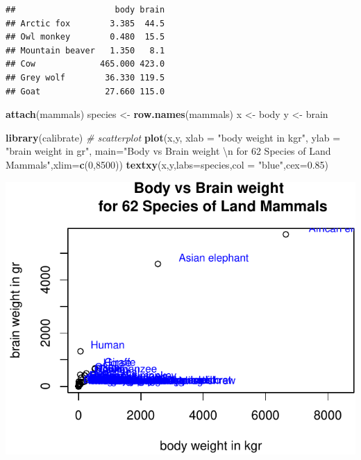\documentclass[]{article}
\newenvironment{Shaded}{\begin{snugshade}}{\end{snugshade}}
\newcommand{\KeywordTok}[1]{\textcolor[rgb]{0.13,0.29,0.53}{\textbf{{#1}}}}
\newcommand{\DataTypeTok}[1]{\textcolor[rgb]{0.13,0.29,0.53}{{#1}}}
\newcommand{\DecValTok}[1]{\textcolor[rgb]{0.00,0.00,0.81}{{#1}}}
\newcommand{\FloatTok}[1]{\textcolor[rgb]{0.00,0.00,0.81}{{#1}}}
\newcommand{\CharTok}[1]{\textcolor[rgb]{0.31,0.60,0.02}{{#1}}}
\newcommand{\StringTok}[1]{\textcolor[rgb]{0.31,0.60,0.02}{{#1}}}
\newcommand{\CommentTok}[1]{\textcolor[rgb]{0.56,0.35,0.01}{\textit{{#1}}}}
\newcommand{\NormalTok}[1]{{#1}}
\numberwithin{equation}{section}
\begin{document}
\begin{verbatim}
##                    body brain
## Arctic fox        3.385  44.5
## Owl monkey        0.480  15.5
## Mountain beaver   1.350   8.1
## Cow             465.000 423.0
## Grey wolf        36.330 119.5
## Goat             27.660 115.0
\end{verbatim}

\begin{Shaded}
\begin{Highlighting}[]
\KeywordTok{attach}\NormalTok{(mammals)}
\NormalTok{species <-}\StringTok{ }\KeywordTok{row.names}\NormalTok{(mammals)}
\NormalTok{x <-}\StringTok{ }\NormalTok{body}
\NormalTok{y <-}\StringTok{ }\NormalTok{brain}
\end{Highlighting}
\end{Shaded}

\begin{Shaded}
\begin{Highlighting}[]
\KeywordTok{library}\NormalTok{(calibrate)}
\CommentTok{# scatterplot}
\KeywordTok{plot}\NormalTok{(x,y, }\DataTypeTok{xlab =} \StringTok{"body weight in kgr"}\NormalTok{, }\DataTypeTok{ylab =} \StringTok{"brain weight in gr"}\NormalTok{, }
     \DataTypeTok{main=}\StringTok{"Body vs Brain weight }\CharTok{\textbackslash{}n}\StringTok{ for 62 Species of Land Mammals"}\NormalTok{,}\DataTypeTok{xlim=}\KeywordTok{c}\NormalTok{(}\DecValTok{0}\NormalTok{,}\DecValTok{8500}\NormalTok{))}
\KeywordTok{textxy}\NormalTok{(x,y,}\DataTypeTok{labs=}\NormalTok{species,}\DataTypeTok{col =} \StringTok{"blue"}\NormalTok{,}\DataTypeTok{cex=}\FloatTok{0.85}\NormalTok{) }
\end{Highlighting}
\end{Shaded}

\begin{center}\includegraphics{tema1_files/figure-latex/unnamed-chunk-77-1} \end{center}
\end{document}
